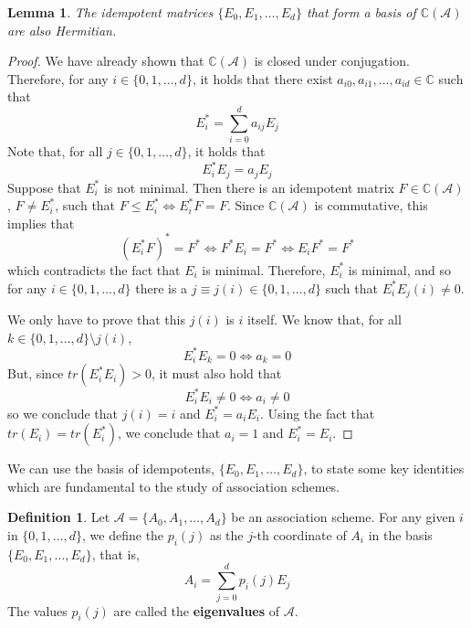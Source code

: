 \documentclass[a4paper,12pt]{article}
\theoremstyle{plain}
\newtheorem{lemma}[theorem]{Lemma}
\theoremstyle{definition}
\newtheorem{definition}[theorem]{Definition}
\theoremstyle{remark}
\begin{document}
\begin{lemma}
    The idempotent matrices $ \{ E_0, E_1, \dots, E_d \} $ that form a basis
    of $ \mathbb{C}(\mathcal{A}) $ are also Hermitian.
\end{lemma}
\begin{proof}
    We have already shown that $ \mathbb{C}(\mathcal{A}) $ is closed under
    conjugation. Therefore, for any $ i \in \{ 0,1,\dots,d \} $, it holds that
    there exist $ a_{i0}, a_{i1}, \dots, a_{id} \in \mathbb{C} $ such that
    \[ E_i^* = \sum_{ i=0 }^{ d } a_{ij} E_j \]
    Note that, for all $ j \in \{ 0,1,\dots,d \} $, it holds that
    \[ E_i^* E_j = a_j E_j \]
    Suppose that $ E_i^* $ is not minimal. Then there is an idempotent matrix
    $ F \in \mathbb{C}(\mathcal{A}) $, $ F \neq E_i^* $, such that
    $ F \leq E_i^* \iff E_i^*F = F $. Since $ \mathbb{C}(\mathcal{A}) $ is
    commutative, this implies that
    \[ (E_i^* F)^* = F^* \iff F^* E_i = F^*  \iff E_i F^* = F^* \]
    which contradicts the fact that $ E_i $ is minimal. Therefore, $ E_i^* $ is
    minimal, and so for any $ i \in \{ 0,1,\dots,d \} $ there is a
    $ j \equiv j(i) \in \{ 0,1,\dots,d \} $ such that $ E_i^* E_j(i) \neq 0 $.

    We only have to prove that this $ j(i) $ is $ i $ itself. We know that, for
    all $ k \in \{ 0,1,\dots,d \} \setminus {j(i)} $,
    \[ E_i^* E_k = 0 \iff a_k = 0 \]
    But, since $ tr(E_i^* E_i) > 0 $, it must also hold that
    \[ E_i^* E_i \neq 0 \iff a_i \neq 0 \]
    so we conclude that $ j(i) = i $ and $ E_i^* = a_i E_i $. Using the fact that
    $ tr(E_i) = tr(E_i^*) $, we conclude that $ a_i = 1 $ and $ E_i^* = E_i $.
\end{proof}

We can use the basis of idempotents, $ \{ E_0, E_1, \dots, E_d \} $, to state
some key identities which are fundamental to the study of association schemes.

\begin{definition}
    Let $ \mathcal{A} = \{ A_0, A_1, \dots, A_d \} $ be an association scheme.
    For any given $ i $ in $ \{ 0,1,\dots,d \} $, we define the $ p_i(j) $ as
    the $ j $-th coordinate of $ A_i $ in the basis $ \{ E_0, E_1, \dots, E_d \} $,
    that is,
    \[ A_i = \sum_{ j=0 }^{ d } p_i(j)E_j \]
    The values $ p_i(j) $ are called the \textbf{eigenvalues} of $ \mathcal{A} $.
\end{definition}
\end{document}
